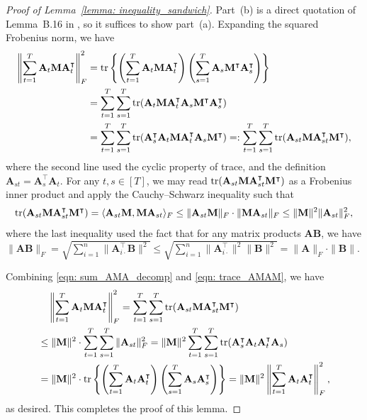 \documentclass[aos]{imsart}
\theoremstyle{plain}
\theoremstyle{definition}
\def\tr{\textnormal{\text{tr}}}
\def\bA{\mathbf{A}}
\def\bB{\mathbf{B}}
\def\bM{\mathbf{M}}
\def\trans{\intercal}
\begin{document}
\begin{proof}[Proof of Lemma~\ref{lemma: inequality_sandwich}]
Part~(b) is a direct quotation of Lemma~B.16 in \cite{Barigozzietal2025_robust}, so it suffices to show part~(a). Expanding the squared Frobenius norm, we have
\begin{equation}
\label{eqn: sum_AMA_decomp}
\begin{split}
    \left\| \sum_{t=1}^T \bA_t \bM \bA_t^\trans \right\|_F^2 &= \tr\left\{ \left( \sum_{t=1}^T \bA_t \bM \bA_t^\trans \right) \left( \sum_{s=1}^T \bA_s \bM^\trans \bA_s^\trans \right) \right\} \\
    &=
    \sum_{t=1}^T \sum_{s=1}^T \tr(\bA_t \bM \bA_t^\trans \bA_s \bM^\trans \bA_s^\trans ) \\
    &=
    \sum_{t=1}^T \sum_{s=1}^T \tr(\bA_s^\trans \bA_t \bM \bA_t^\trans \bA_s \bM^\trans )
    =: \sum_{t=1}^T \sum_{s=1}^T \tr(\bA_{st} \bM \bA_{st}^\trans \bM^\trans ) ,
\end{split}
\end{equation}
where the second line used the cyclic property of trace, and the definition $\bA_{st}= \bA_s^\trans \bA_t$. For any $t,s\in[T]$, we may read $\tr(\bA_{st} \bM \bA_{st}^\trans \bM^\trans)$ as a Frobenius inner product and apply the Cauchy--Schwarz inequality such that
\begin{equation}
\label{eqn: trace_AMAM}
\tr(\bA_{st} \bM \bA_{st}^\trans \bM^\trans) = \langle \bA_{st} \bM, \bM \bA_{st} \rangle_F \leq \|\bA_{st} \bM\|_F \cdot \|\bM \bA_{st}\|_F \leq \|\bM\|^2 \|\bA_{st}\|_F^2 ,
\end{equation}
where the last inequality used the fact that for any matrix products $\bA\bB$, we have $\|\bA\bB\|_F=\sqrt{\sum_{i=1}^n \|\bA_{i\cdot}^\top \bB\|^2} \leq \sqrt{\sum_{i=1}^n \|\bA_{i\cdot}^\top\|^2 \|\bB\|^2} = \|\bA\|_F \cdot \|\bB\|$.

Combining \eqref{eqn: sum_AMA_decomp} and \eqref{eqn: trace_AMAM}, we have
\begin{align*}
    &\quad
    \left\| \sum_{t=1}^T \bA_t \bM \bA_t^\trans \right\|_F^2 = \sum_{t=1}^T \sum_{s=1}^T \tr(\bA_{st} \bM \bA_{st}^\trans \bM^\trans) \\
    &\leq
    \|\bM\|^2 \cdot \sum_{t=1}^T \sum_{s=1}^T \|\bA_{st}\|_F^2
    = \|\bM\|^2 \sum_{t=1}^T \sum_{s=1}^T \tr(\bA_s^\trans \bA_t \bA_t^\trans \bA_s) \\
    &=
    \|\bM\|^2 \cdot \tr\left\{ \left( \sum_{t=1}^T \bA_t \bA_t^\trans \right) \left( \sum_{s=1}^T \bA_s \bA_s^\trans \right) \right\}
    = \|\bM\|^2 \left\| \sum_{t=1}^T \bA_t \bA_t^\trans \right\|_F^2 ,
\end{align*}
as desired. This completes the proof of this lemma.
\end{proof}
\end{document}

